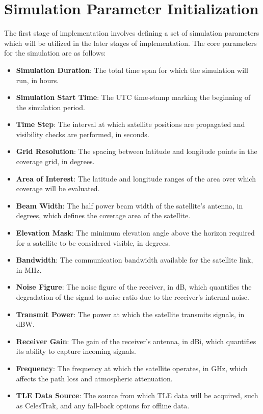 \section{Simulation Parameter Initialization}
The first stage of implementation involves defining a set of simulation parameters which will be utilized in the later stages of implementation. The core parameters for the simulation are as follows:
\begin{itemize}
    \item \textbf{Simulation Duration}: The total time span for which the simulation will run, in hours.
    \item \textbf{Simulation Start Time}: The UTC time-stamp marking the beginning of the simulation period.
    \item \textbf{Time Step}: The interval at which satellite positions are propagated and visibility checks are performed, in seconds.
    \item \textbf{Grid Resolution}: The spacing between latitude and longitude points in the coverage grid, in degrees.
    \item \textbf{Area of Interest}: The latitude and longitude ranges of the area over which coverage will be evaluated.
    \item \textbf{Beam Width}: The half power beam width of the satellite's antenna, in degrees, which defines the coverage area of the satellite.
    \item \textbf{Elevation Mask}: The minimum elevation angle above the horizon required for a satellite to be considered visible, in degrees.
    \item \textbf{Bandwidth}: The communication bandwidth available for the satellite link, in MHz.
    \item \textbf{Noise Figure}: The noise figure of the receiver, in dB, which quantifies the degradation of the signal-to-noise ratio due to the receiver's internal noise.
    \item \textbf{Transmit Power}: The power at which the satellite transmits signals, in dBW.
    \item \textbf{Receiver Gain}: The gain of the receiver's antenna, in dBi, which quantifies its ability to capture incoming signals.
    \item \textbf{Frequency}: The frequency at which the satellite operates, in GHz, which affects the path loss and atmospheric attenuation.
    \item \textbf{TLE Data Source}: The source from which TLE data will be acquired, such as CelesTrak, and any fall-back options for offline data.
\end{itemize}

